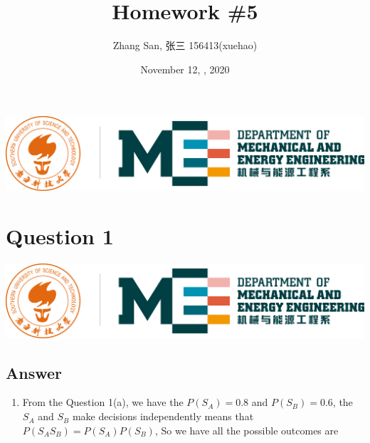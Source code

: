 \documentclass[
	12pt, %
]{fphw}
\begin{document}
\title{Homework \#5} %
\author{Zhang San, 张三 156413(xuehao)} %
\date{November 12, , 2020} %
\includegraphics[scale=0.75]{img/logo.png}


\setlength{\abovecaptionskip}{-0.1cm}
\setlength{\belowcaptionskip}{0cm}   %


\maketitle %


\section*{Question 1}
\begin{problem}
	\includegraphics[width=440pt]{img/logo.png}
\end{problem}


\subsection*{Answer}
\begin{enumerate}
    \item From the Question 1(a), we have the $P(S_A)=0.8$ and $P(S_B)=0.6$, the $S_A$ and $S_B$ make decisions independently means that $P(S_AS_B)=P(S_A)P(S_B)$, So we have all the possible outcomes are 
\end{enumerate}
\clearpage
\end{document}
